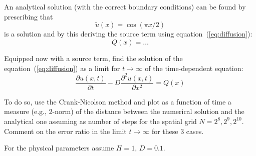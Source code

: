 \documentclass[10pt]{article}
\begin{document}
An analytical solution (with the correct boundary conditions) can be found by prescribing that 
%
\begin{equation}
\tilde u(x) = \cos(\pi x / 2)
\end{equation}
%
is a solution and by this deriving the source term using equation~(\ref{eq:diffusion}):
%
\begin{equation}
Q(x) = \dots 
\end{equation}

Equipped now with a source term, find the solution of the equation~(\ref{eq:diffusion}) as a limit for $t \rightarrow \infty$ of the time-dependent equation:
%
\begin{equation}
\frac{\partial u(x,t)}{\partial t} -D \frac{\partial^2 u(x,t)}{\partial x^2} = Q(x)
\end{equation}

To do so, use the Crank-Nicolson method and plot as a function of time a measure (e.g., 2-norm) of the distance between the numerical solution and the analytical one assuming as number of steps for the spatial grid $N = 2^8, 2^9, 2^{10}$. Comment on the error ratio in the limit  $t \rightarrow \infty$ for these 3 cases.

For the physical parameters assume $H = 1$, $D = 0.1$.
\end{document}
